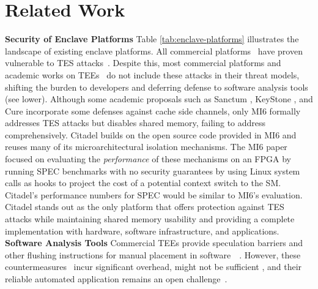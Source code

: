 \section{Related Work}
\label{sec:relatedwork}
\noindent\textbf{Security of Enclave Platforms}
\label{sec:enclaveplatforms}
Table \ref{tab:enclave-platforms} illustrates the landscape of existing enclave platforms. 
All commercial platforms~\cite{mckeen2013sgx, costan2016intel,cheng2024intel, sev2020strengthening,trustzone04, pinto2019demystifying, li2022design} have proven vulnerable to TES attacks~\cite{chen2019sgxpectre,van2020sgaxe,gotzfried2017cache,brasser2017software,van2018foreshadow,van2020lvi,weisse2018foreshadow,ryan2019hardware,xu2024trustzonetunnel}.
Despite this, most commercial platforms and academic works on TEEs~\cite{azab2011sice, brasser2019sanctuary, deng2014equalvisor, feng2021scalable, van2023cheri, ferraiuolo2017komodo, weiser2019timber, van2023cheri, li2021confidential, lee2022cerberus, park2020nested, steinegger2021servas} do not include these attacks in their threat models, shifting the burden to developers and deferring defense to software analysis tools (see lower).
Although some academic proposals such as Sanctum \cite{costan2016sanctum}, KeyStone \cite{lee2020keystone}, and Cure \cite{bahmani2021cure} incorporate some defenses against cache side channels, only MI6 \cite{bourgeat2019mi6} formally addresses TES attacks but disables shared memory, failing to address \prob{} comprehensively.
Citadel builds on the open source code provided in MI6 \cite{bourgeat2019mi6} and reuses many of its microarchitectural isolation mechanisms.
The MI6 paper focused on evaluating the \emph{performance} of these mechanisms on an FPGA
by running SPEC benchmarks with no security guarantees by using Linux system calls as hooks to project the cost of a potential context switch to the SM.
Citadel's performance numbers for SPEC would be similar to MI6's evaluation.
Citadel stands out as the only platform that offers protection against TES attacks while maintaining shared memory usability and providing a complete implementation with hardware, software infrastructure, and applications.
\\

\noindent\textbf{Software Analysis Tools}
\label{sec:softwaremitigations}
Commercial TEEs provide speculation barriers and other flushing instructions for manual placement in software~~\cite{TrustDomainIntel, ArmSpecualtiveVulnerabilities, AMDsoftwarespecualtion}.
However, these countermeasures~\cite{mosier2024serberus, cauligi2022sok, disselkoen2020finding, guanciale2020inspectre} incur significant overhead, might not be sufficient \cite{barberis2022branch}, and their reliable automated application remains an open challenge~\cite{LLVMdevSpeculativeLoadHardening,IntelAnalysisSideChannel, MicrosoftMSVC,wang2019oo7}.

